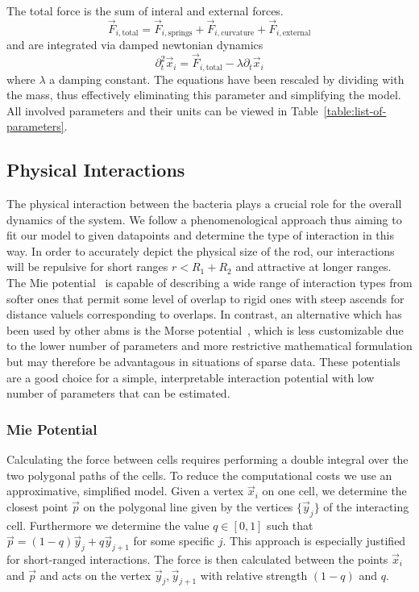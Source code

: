 The total force is the sum of interal and external forces.
\begin{equation}
    \vec{F}_{i,\text{total}} = \vec{F}_{i,\text{springs}}+ \vec{F}_{i,\text{curvature}}
    + \vec{F}_{i,\text{external}}
\end{equation}
and are integrated via damped newtonian dynamics
\begin{equation}
    \partial_t^2 \vec{x}_i = \vec{F}_{i,\text{total}} - \lambda \partial_t\vec{x}_i
\end{equation}
where $\lambda$ a damping constant.
The equations have been rescaled by dividing with the mass, thus effectively eliminating this
parameter and simplifying the model.
All involved parameters and their units can be viewed in Table~\ref{table:list-of-parameters}.

\subsection{Physical Interactions}

The physical interaction between the bacteria plays a crucial role for the overall dynamics of the
system.
We follow a phenomenological approach thus aiming to fit our model to given datapoints and determine
the type of interaction in this way.
In order to accurately depict the physical size of the rod, our interactions will be repulsive for
short ranges $r<R_1+R_2$ and attractive at longer ranges.
The Mie potential~\cite{Mie1903} is capable of describing a wide range of interaction
types from softer ones that permit some level of overlap to rigid ones with steep ascends for
distance valuels corresponding to overlaps.
In contrast, an alternative which has been used by other \acp{abm} is the Morse
potential~\cite{Morse1929,Kang2014,Breitwieser2021}, which is less
customizable due to the lower number of parameters and more restrictive mathematical formulation
but may therefore be advantagous in situations of sparse data.
These potentials are a good choice for a simple, interpretable interaction potential with
low number of parameters that can be estimated.

\subsubsection{Mie Potential}

Calculating the force between cells requires performing a double integral over the two polygonal
paths of the cells.
To reduce the computational costs we use an approximative, simplified model.
Given a vertex $\vec{x}_i$ on one cell, we determine the closest point $\vec{p}$ on the polygonal
line given by the vertices $\{\vec{y}_j\}$ of the interacting cell.
Furthermore we determine the value $q\in[0,1]$ such that $\vec{p} = (1-q)\vec{y}_j + q\vec{y}_{j+1}$
for some specific $j$.
This approach is especially justified for short-ranged interactions.
The force is then calculated between the points $\vec{x}_i$ and $\vec{p}$ and acts on
the vertex $\vec{y}_j,\vec{y}_{j+1}$ with relative strength $(1-q)$ and $q$.

